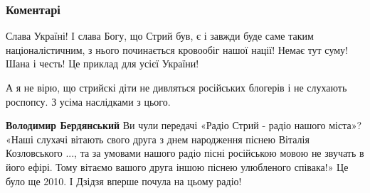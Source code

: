  
 
 
 
 
\subsubsection{Коментарі}

\begin{itemize}

 

Слава Україні! І слава Богу, що Стрий був, є і завжди буде саме таким
націоналістичним, з нього починається кровообіг нашої нації! Немає тут суму!
Шана і честь! Це приклад для усієї України!

 

А я не вірю, що стрийскі діти не дивляться російських блогерів і не слухають
роспопсу. З усіма наслідками з цього.

 

\textbf{Володимир Бердянський} Ви чули передачі «Радіо Стрий - радіо нашого міста»?
«Наші слухачі вітають свого друга з днем народження піснею Віталія Козловського
..., та за умовами нашого радіо пісні російською мовою не звучать в його ефірі.
Тому вітаємо вашого друга іншою піснею улюбленого співака!» Це було ще 2010. І
Дзідзя вперше почула на цьому радіо!

 


\end{itemize}

